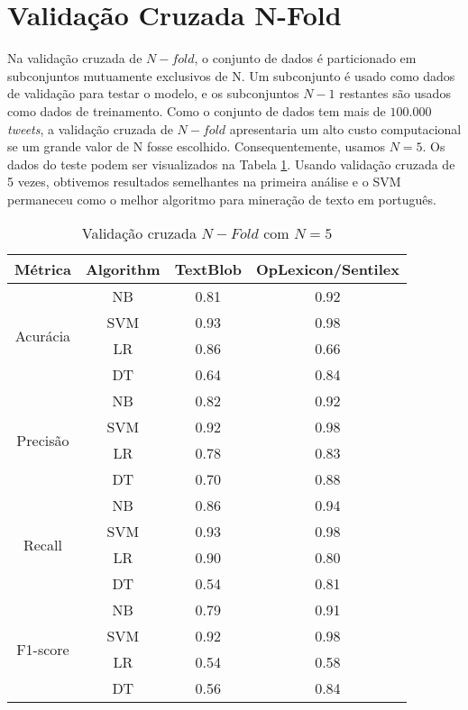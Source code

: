 \section{Validação Cruzada N-Fold}

Na validação cruzada de $N-fold$, o conjunto de dados é
particionado em subconjuntos mutuamente exclusivos de N.
Um subconjunto é usado como dados de validação para testar
o modelo, e os subconjuntos $N −1$ restantes são usados como
dados de treinamento. Como o conjunto de dados tem mais
de $100.000$ \textit{tweets}, a validação cruzada de $N-fold$ apresentaria
um alto custo computacional se um grande valor de N fosse
escolhido. Consequentemente, usamos $N = 5$. Os dados do
teste podem ser visualizados na Tabela \ref{tb:fold}.
Usando validação cruzada de 5 vezes, obtivemos resultados
semelhantes na primeira análise e o SVM permaneceu como
o melhor algoritmo para mineração de texto em português.


\begin{table}[tbp]
    \centering
    \caption{Validação cruzada $N-Fold$ com $N=5$ }
    \label{tb:fold}
    \begin{tabular}{@{}cccc@{}}
    \toprule  \hline
    Métrica & Algorithm & TextBlob & OpLexicon/Sentilex \\  \hline
    \multirow{4}{*}{Acurácia} & NB & 0.81 & 0.92 \\ 
     & SVM & 0.93 & 0.98 \\ 
     & LR & 0.86 & 0.66 \\ 
     & DT & 0.64 & 0.84  \\  \hline
    \multirow{4}{*}{Precisão} & NB & 0.82 & 0.92 \\ 
     & SVM & 0.92 & 0.98 \\ 
     & LR & 0.78 & 0.83 \\ 
     & DT & 0.70  & 0.88  \\ \hline
    \multirow{4}{*}{Recall} & NB & 0.86 & 0.94 \\ 
     & SVM & 0.93 & 0.98 \\ 
     & LR & 0.90 & 0.80 \\ 
     & DT & 0.54  & 0.81  \\ \hline 
    \multirow{4}{*}{F1-score} & NB & 0.79 & 0.91 \\ 
     & SVM & 0.92 & 0.98 \\ 
     & LR & 0.54 & 0.58 \\
     & DT & 0.56 & 0.84  \\ \hline
    \end{tabular}
    \end{table}


